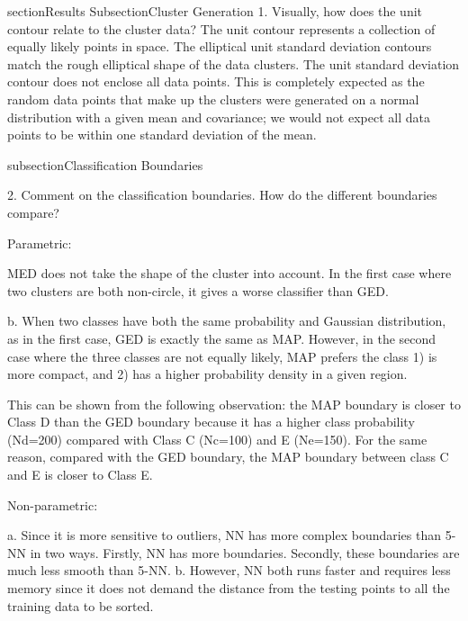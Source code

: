 section{Results}
Subsection{Cluster Generation}
1.	Visually, how does the unit contour relate to the cluster data?
The unit contour represents a collection of equally likely points in space. The elliptical unit standard deviation contours match the rough elliptical shape of the data clusters. The unit standard deviation contour does not enclose all data points.  This is completely expected as the random data points that make up the clusters were generated on a normal distribution with a given mean and covariance; we would not expect all data points to be within one standard deviation of the mean.  

subsection{Classification Boundaries}

2.	Comment on the classification boundaries. How do the different boundaries compare?

Parametric:

MED does not take the shape of the cluster into account. In the first case where two clusters are both non-circle, it gives a worse classifier than GED.

b.	When two classes have both the same probability and Gaussian distribution, as in the first case, GED is exactly the same as MAP. However, in the second case where the three classes are not equally likely, MAP prefers the class 1) is more compact, and 2) has a higher probability density in a given region. 

This can be shown from the following observation: the MAP boundary is closer to Class D than the GED boundary because it has a higher class probability (Nd=200) compared with Class C (Nc=100) and E (Ne=150). For the same reason, compared with the GED boundary, the MAP boundary between class C and E is closer to Class E.

Non-parametric:

a.	Since it is more sensitive to outliers, NN has more complex boundaries than 5-NN in two ways. Firstly, NN has more boundaries. Secondly, these boundaries are much less smooth than 5-NN.
b.	However, NN both runs faster and requires less memory since it does not demand the distance from the testing points to all the training data to be sorted.

